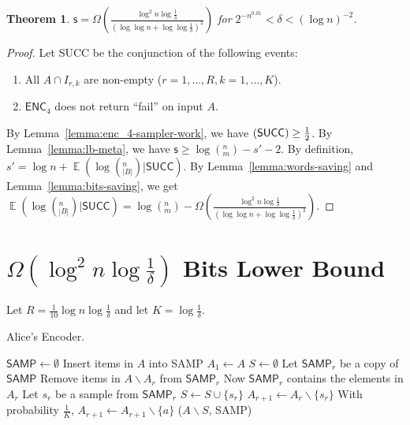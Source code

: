 \documentclass[10pt]{article}
\DeclareMathOperator*{\E}{\mathbb{E}}
\let\Pr\relax
\DeclareMathOperator*{\Pr}{\mathbb{P}}
\newtheorem{theorem}{Theorem}
\newcommand{\samp}{\textsf{SAMP}\xspace}
\newcommand{\success}{\textsf{SUCC}\xspace}
\newcommand{\enc}{\textsf{ENC}\xspace}
\newcommand{\s}{\textsf{s}\xspace}
\begin{document}
\begin{theorem}
  $\s = \Omega(\frac{\log^2 n\log{\frac{1}{\delta}}}{(\log\log n+\log\log \frac{1}{\delta})^2})$ for $2^{-n^{0.01}}<\delta<(\log n)^{-2}$.
\end{theorem}

\begin{proof}
  Let \success be the conjunction of the following events:
  \begin{enumerate}
    \item All $A \cap I_{r,k}$ are non-empty ($r=1,\ldots, R, k=1,\ldots, K$).
    \item $\enc_4$ does not return ``fail'' on input $A$.
  \end{enumerate}
  By Lemma~\ref{lemma:enc_4-sampler-work}, we have $\Pr(\success)\ge \frac{1}{2}$. By Lemma~\ref{lemma:lb-meta}, we have $\s\ge \log (^n_m) - s' -2$. By definition, $s'=\log n + \E(\log (^n_{|B|})|\success)$. By Lemma~\ref{lemma:words-saving} and Lemma~\ref{lemma:bits-saving}, we get $\E(\log (^n_{|B|})|\success)=\log (^n_m)-\Omega(\frac{\log^2 n\log{\frac{1}{\delta}}}{(\log\log n+\log\log \frac{1}{\delta})^2})$. 
\end{proof}

\section{$\Omega(\log^2 n \log \frac{1}{\delta})$ Bits Lower Bound}

Let $R=\frac{1}{10}\log n \log \frac{1}{\delta}$ and let $K=\log \frac{1}{\delta}$. 

\begin{algorithm}[H]
  \caption{Alice's Encoder.}
  \begin{algorithmic}[1]
    \Procedure{$\enc$}{$A$}
    \State $\samp \leftarrow \emptyset$
    \State Insert items in $A$ into \samp
    \State $A_1 \leftarrow A$
    \State $S\leftarrow \emptyset$
      \State Let $\samp_r$ be a copy of $\samp$
      \State Remove items in $A\backslash A_r$ from $\samp_r$ \Comment Now $\samp_r$ contains the elements in $A_r$
      \State Let $s_r$ be a sample from $\samp_r$
      \State $S\leftarrow S \cup \{s_r\}$
      \State $A_{r+1}\leftarrow A_r \backslash \{s_r\}$
        \State With probability $\frac{1}{K}$, $A_{r+1}\leftarrow A_{r+1}\backslash \{a\}$ 
      \EndFor
    \EndFor
    \State \Return ($A\backslash S$, \samp) 
    \EndProcedure
  \end{algorithmic}
\end{algorithm}
\end{document}

